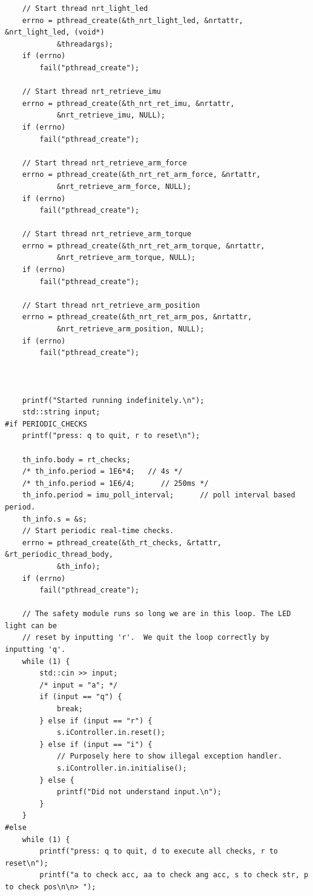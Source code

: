\documentclass[12pt]{scrreprt}
\begin{document}
\begin{appendices}
\begin{verbatim}
    // Start thread nrt_light_led
    errno = pthread_create(&th_nrt_light_led, &nrtattr, &nrt_light_led, (void*)
            &threadargs);
    if (errno)
        fail("pthread_create");

    // Start thread nrt_retrieve_imu
    errno = pthread_create(&th_nrt_ret_imu, &nrtattr,
            &nrt_retrieve_imu, NULL);
    if (errno)
        fail("pthread_create");

    // Start thread nrt_retrieve_arm_force
    errno = pthread_create(&th_nrt_ret_arm_force, &nrtattr,
            &nrt_retrieve_arm_force, NULL);
    if (errno)
        fail("pthread_create");

    // Start thread nrt_retrieve_arm_torque
    errno = pthread_create(&th_nrt_ret_arm_torque, &nrtattr,
            &nrt_retrieve_arm_torque, NULL);
    if (errno)
        fail("pthread_create");

    // Start thread nrt_retrieve_arm_position
    errno = pthread_create(&th_nrt_ret_arm_pos, &nrtattr,
            &nrt_retrieve_arm_position, NULL);
    if (errno)
        fail("pthread_create");



    printf("Started running indefinitely.\n");
    std::string input;
#if PERIODIC_CHECKS
    printf("press: q to quit, r to reset\n");

    th_info.body = rt_checks;
    /* th_info.period = 1E6*4;   // 4s */
    /* th_info.period = 1E6/4;      // 250ms */
    th_info.period = imu_poll_interval;      // poll interval based period.
    th_info.s = &s;
    // Start periodic real-time checks.
    errno = pthread_create(&th_rt_checks, &rtattr, &rt_periodic_thread_body,
            &th_info);
    if (errno)
        fail("pthread_create");

    // The safety module runs so long we are in this loop. The LED light can be
    // reset by inputting 'r'.  We quit the loop correctly by inputting 'q'.
    while (1) {
        std::cin >> input;
        /* input = "a"; */
        if (input == "q") {
            break;
        } else if (input == "r") {
            s.iController.in.reset();
        } else if (input == "i") {
            // Purposely here to show illegal exception handler.
            s.iController.in.initialise();
        } else {
            printf("Did not understand input.\n");
        }
    }
#else
    while (1) {
        printf("press: q to quit, d to execute all checks, r to reset\n");
        printf("a to check acc, aa to check ang acc, s to check str, p to check pos\n\n> ");


\end{verbatim}
\end{appendices}
\end{document}
